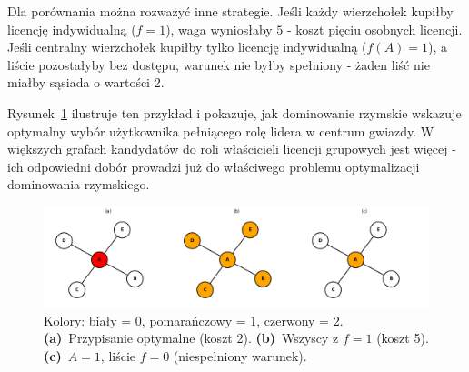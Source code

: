 Dla porównania można rozważyć inne strategie. Jeśli każdy wierzchołek kupiłby licencję indywidualną ($f=1$), waga wyniosłaby $5$ - koszt pięciu osobnych licencji. Jeśli centralny wierzchołek kupiłby tylko licencję indywidualną ($f(A)=1$), a liście pozostałyby bez dostępu, warunek nie byłby spełniony - żaden liść nie miałby sąsiada o wartości 2.

Rysunek~\ref{fig:romandomatinonstarexamepl} ilustruje ten przykład i pokazuje, jak dominowanie rzymskie wskazuje optymalny wybór użytkownika pełniącego rolę lidera w centrum gwiazdy. W większych grafach kandydatów do roli właścicieli licencji grupowych jest więcej - ich odpowiedni dobór prowadzi już do właściwego problemu optymalizacji dominowania rzymskiego.


\begin{figure}[ht]
  \centering
  \includegraphics[width=1\textwidth]{assets/stars.png}
  \caption{
    Kolory: biały = $0$, pomarańczowy = $1$, czerwony = $2$.
    \textbf{(a)}~Przypisanie optymalne (koszt 2).
    \textbf{(b)}~Wszyscy z $f=1$ (koszt 5).
    \textbf{(c)}~$A=1$, liście $f=0$ (niespełniony warunek).
  }
  \label{fig:romandomatinonstarexamepl}
\end{figure}



